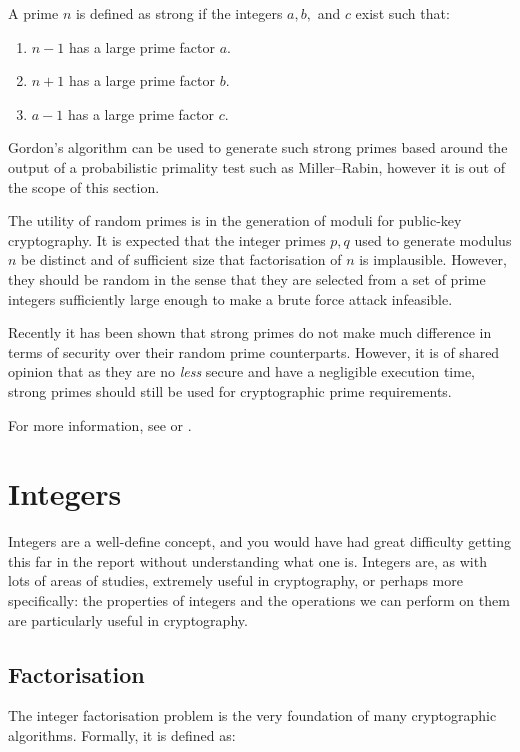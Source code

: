   A prime $n$ is defined as strong if the integers $a,b,$ and $c$ exist such that:
  
  \begin{enumerate}
    \item $n - 1$ has a large prime factor $a$.
    \item $n + 1$ has a large prime factor $b$.
    \item $a - 1$ has a large prime factor $c$.
  \end{enumerate}
  
  Gordon's algorithm can be used to generate such strong primes based around the output of a probabilistic primality test such as Miller--Rabin, however it is out of the scope of this section.
  
  The utility of random primes is in the generation of moduli for public-key cryptography. It is expected that the integer primes $p,q$ used to generate modulus $n$ be distinct and of sufficient size that factorisation of $n$ is implausible. However, they should be random in the sense that they are selected from a set of prime integers sufficiently large enough to make a brute force attack infeasible.
  
  Recently it has been shown that strong primes do not make much difference in terms of security over their random prime counterparts. However, it is of shared opinion that as they are no \emph{less} secure and have a negligible execution time, strong primes should still be used for cryptographic prime requirements.
  
  For more information, see \cite{Rivest:1999aa} or \cite{Gordon:1985aa}.

\section{Integers}

Integers are a well-define concept, and you would have had great difficulty getting this far in the report without understanding what one is. Integers are, as with lots of areas of studies, extremely useful in cryptography, or perhaps more specifically: the properties of integers and the operations we can perform on them are particularly useful in cryptography.

  \subsection{Factorisation}
  
  The integer factorisation problem is the very foundation of many cryptographic algorithms. Formally, it is defined as:
  
